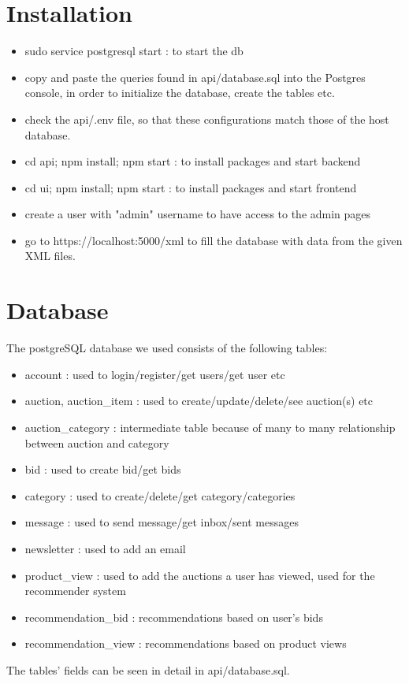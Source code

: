 \documentclass{article}
\begin{document}
\section{Installation}
\begin{itemize}
\item sudo service postgresql start : to start the db
\item copy and paste the queries found in api/database.sql into the Postgres console, in order to initialize the database, create the tables etc.
\item check the api/.env file, so that these configurations match those of the host database.
\item cd api; npm install; npm start : to install packages and start backend
\item cd ui; npm install; npm start : to install packages and start frontend
\item create a user with "admin" username to have access to the admin pages
\item go to https://localhost:5000/xml to fill the database with data from the given XML files.
\end{itemize}
\section{Database}
The postgreSQL database we used consists of the following tables:
\begin{itemize}
\item account : used to login/register/get users/get user etc
\item auction, auction\_item : used to create/update/delete/see auction(s) etc
\item auction\_category : intermediate table because of many to many relationship between auction and category
\item bid : used to create bid/get bids
\item category : used to create/delete/get category/categories
\item message : used to send message/get inbox/sent messages
\item newsletter : used to add an email
\item product\_view : used to add the auctions a user has viewed, used for the recommender system
\item recommendation\_bid : recommendations based on user's bids
\item recommendation\_view : recommendations based on product views
\end{itemize}
The tables' fields can be seen in detail in api/database.sql.
\end{document}
